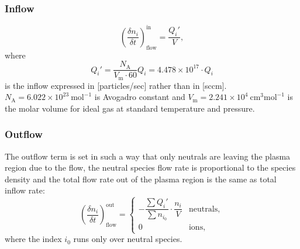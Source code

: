 \subsubsection{Inflow}
\begin{equation}
    \left( \frac{\delta n_{i}}{\delta t} \right)_{\mathrm{flow}} ^{\mathrm{in}} = \frac{Q_{i}'}{V},
\end{equation}
where
\[
Q_{i}' = \frac{N_{\mathrm{A}}}{V_{\mathrm{m}} \cdot 60} Q_{i} = 4.478 \times 10^{17} \cdot Q_{i}
\]
is the inflow expressed in [particles/sec] rather than in [sccm].
$N_{\mathrm{A}} = 6.022 \times 10^{23}~\mathrm{mol}^{-1}$ is
Avogadro constant and $V_{\mathrm{m}} = 2.241 \times 10^4~\mathrm{cm}^3 \mathrm{mol}^{-1}$ is the molar volume
for ideal gas at standard temperature and pressure.

\subsubsection*{Outflow}
The outflow term is set in such a way that only neutrals are leaving the plasma region due to the flow,
the neutral species flow rate is proportional to the species density and the total flow rate out of the plasma region
is the same as total inflow rate:
\begin{equation}
    \left( \frac{\delta n_{i}}{\delta t} \right)_{\mathrm{flow}} ^{\mathrm{out}} =
    \begin{cases}
        -\dfrac{\sum  Q_{i}'}{\sum n_{i_{0}}} \cdot \dfrac{n_{i}}{V} & \mathrm{neutrals}, \\
        0 & \mathrm{ions},
    \end{cases}
\end{equation}
where the index $i_{0}$ runs only over neutral species.

